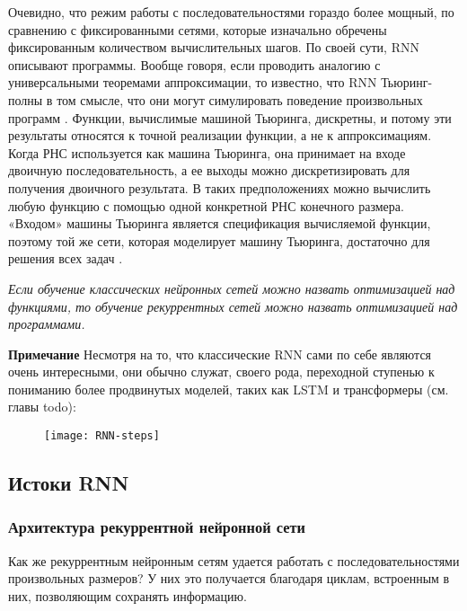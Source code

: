 Очевидно, что режим работы с последовательностями гораздо более мощный, по сравнению 
с фиксированными сетями, которые изначально обречены фиксированным количеством 
вычислительных шагов. По своей сути, RNN описывают программы. Вообще говоря, 
если проводить аналогию с универсальными теоремами аппроксимации, то известно, что 
RNN Тьюринг-полны в том смысле, что они могут симулировать поведение произвольных 
программ \cite{karpathy}. Функции, вычислимые машиной Тьюринга, дискретны, и потому 
эти результаты относятся к точной реализации функции, а не к аппроксимациям. 
Когда РНС используется как машина Тьюринга, она принимает на входе двоичную 
последовательность, а ее выходы можно дискретизировать для получения двоичного результата. В таких
предположениях можно вычислить любую функцию с помощью одной конкретной
РНС конечного размера. «Входом» машины Тьюринга является спецификация вычисляемой
функции, поэтому той же сети, которая моделирует машину Тьюринга, достаточно
для решения всех задач \cite{Goodfellow-et-al-2016}.
\begin{center}
    \textit{Если обучение классических нейронных сетей можно назвать оптимизацией над 
    функциями, то обучение рекуррентных сетей можно назвать оптимизацией над программами.}
\end{center}

\noindent\textbf{Примечание} \hspace{10pt} Несмотря на то, что классические RNN сами по себе являются очень интересными, 
они обычно служат, своего рода, переходной ступенью к пониманию более 
продвинутых моделей, таких как LSTM и трансформеры (см. главы {\color{red} todo}):

\begin{figure}[h!]
    \centering
    \texttt{[image: RNN-steps]}
    \caption{\cite{statquest_ml_series}}
    \label{fig:RNN-steps}
\end{figure}

\newpage

\subsection{Истоки RNN}

\subsubsection{Архитектура рекуррентной нейронной сети}

Как же рекуррентным нейронным сетям удается работать с последовательностями 
произвольных размеров? У них это получается благодаря циклам, встроенным 
в них, позволяющим сохранять информацию.

